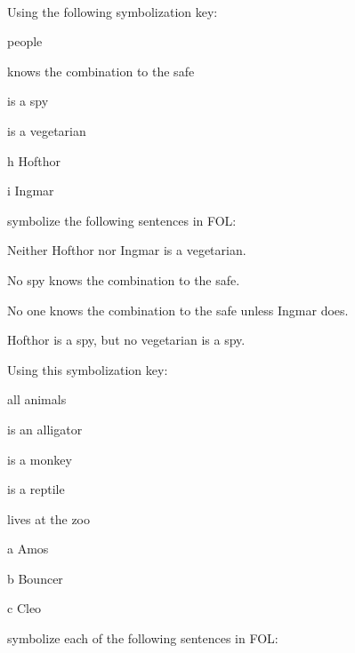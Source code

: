 \

\problempart
\label{pr.FOLvegetarians}
Using the following symbolization key:
\begin{ekey}
\item[\text{domain}] people
\item[\atom{K}{x}]  knows the combination to the safe
\item[\atom{S}{x}]  is a spy
\item[\atom{V}{x}]  is a vegetarian
\item[h] Hofthor
\item[i] Ingmar
\end{ekey}
symbolize the following sentences in FOL:
\begin{earg}
\item Neither Hofthor nor Ingmar is a vegetarian.
\item No spy knows the combination to the safe.
\item No one knows the combination to the safe unless Ingmar does.
\item Hofthor is a spy, but no vegetarian is a spy.
\end{earg}
\solutions
\problempart\label{pr.FOLalligators}
Using this symbolization key:
\begin{ekey}
\item[\text{domain}] all animals
\item[\atom{A}{x}]  is an alligator
\item[\atom{M}{x}]  is a monkey
\item[\atom{R}{x}]  is a reptile
\item[\atom{Z}{x}]  lives at the zoo
\item[a] Amos
\item[b] Bouncer
\item[c] Cleo
\end{ekey}
symbolize each of the following sentences in FOL:
